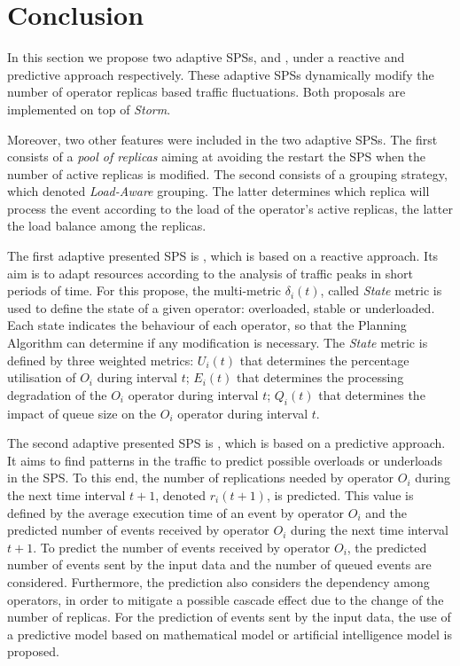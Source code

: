\section{Conclusion}
In this section we propose two adaptive SPSs, \rSPS{} and \pSPS{}, under a reactive and predictive approach respectively. These adaptive SPSs dynamically modify the number of operator replicas based traffic fluctuations. Both proposals are implemented on top of \textit{Storm}.

Moreover, two other features were included in the two adaptive SPSs. The first consists of a \textit{pool of replicas} aiming at avoiding the restart the SPS when the number of active replicas is modified. The second consists of a grouping strategy, which denoted \textit{Load-Aware} grouping. The latter determines which replica will process the event according to the load of the operator's active replicas, the latter the load balance among the replicas.

The first adaptive presented SPS is \rSPS{}, which is based on a reactive approach. Its aim is to adapt resources according to the analysis of traffic peaks in short periods of time. For this propose, the multi-metric $\delta_i(t)$, called \textit{State} metric is used to define the state of a given operator: overloaded, stable or underloaded. Each state indicates the behaviour of each operator, so that the Planning Algorithm can determine if any modification is necessary. The \textit{State} metric is defined by three weighted metrics: $U_i(t)$ that determines the percentage utilisation of $O_i$ during interval $t$; $E_i(t)$ that determines the processing degradation of the $O_i$ operator during interval $t$; $Q_i(t)$ that determines the impact of queue size on the $O_i$ operator during interval $t$.

The second adaptive presented SPS is \pSPS{}, which is based on a predictive approach. It aims to find patterns in the traffic to predict possible overloads or underloads in the SPS. To this end, the number of replications needed by operator $O_i$ during the next time interval $t+1$, denoted $r_i(t+1)$, is predicted. This value is defined by the average execution time of an event by operator $O_i$ and the predicted number of events received by operator $O_i$ during the next time interval $t+1$. To predict the number of events received by operator $O_i$, the predicted number of events sent by the input data and the number of queued events are considered. Furthermore, the prediction also considers the dependency among operators, in order to mitigate a possible cascade effect due to the change of the number of replicas. For the prediction of events sent by the input data, the use of a predictive model based on mathematical model or artificial intelligence model is proposed.
